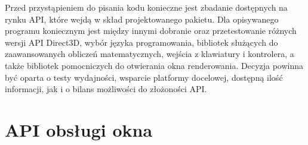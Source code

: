 


Przed przystąpieniem do pisania kodu konieczne jest zbadanie dostępnych
na rynku API, które wejdą w skład projektowanego pakietu. Dla
opisywanego programu koniecznym jest między innymi dobranie oraz
przetestowanie różnych wersji API Direct3D, wybór języka programowania,
bibliotek służących do zaawansowanych obliczeń matematycznych, wejścia z
klawiatury i kontrolera, a także bibliotek pomocniczych do otwierania
okna renderowania. Decyzja powinna być oparta o testy wydajności,
wsparcie platformy docelowej, dostępną ilość informacji, jak i o bilans
możliwości do złożoności API.

\section{API obsługi okna}

